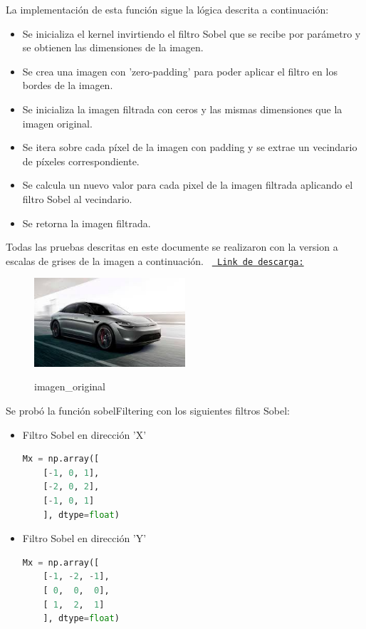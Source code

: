 \documentclass{article}
\begin{document}
    \clearpage
    \noindent
    La implementación de esta función sigue la lógica descrita a continuación:
    \begin{itemize}
        \item Se inicializa el kernel invirtiendo el filtro Sobel que se recibe por parámetro y se obtienen las dimensiones de la imagen.
        \item Se crea una imagen con 'zero-padding' para poder aplicar el filtro en los bordes de la imagen.
        \item Se inicializa la imagen filtrada con ceros y las mismas dimensiones que la imagen original.
        \item Se itera sobre cada píxel de la imagen con padding y se extrae un vecindario de píxeles correspondiente.
        \item Se calcula un nuevo valor para cada pixel de la imagen filtrada aplicando el filtro Sobel al vecindario.
        \item Se retorna la imagen filtrada.
    \end{itemize}
    
    \noindent
    Todas las pruebas descritas en este documente se realizaron con la version a escalas de grises de la imagen a continuación.
    \texttt{%
        \href{https://drive.google.com/uc?id=1Vjzotd2ggul9GuD0adkf5KHCen6vQupK&authuser=0}{%
            Link de descarga:}%
    }
    \begin{figure}[!ht]
        \centering
        \caption{imagen\_original}
        \includegraphics[width=0.5\textwidth]{img/carro}\label{fig:1}
    \end{figure}
    
    \noindent
    Se probó la función sobelFiltering con los siguientes filtros Sobel:
    \begin{itemize}
        \item Filtro Sobel en dirección 'X'
        \begin{lstlisting}[language=Python, caption={Filtro Sobel vertical},label={lst:sobelFiltersx}]
    Mx = np.array([
    [-1, 0, 1],
    [-2, 0, 2],
    [-1, 0, 1]
    ], dtype=float)
        \end{lstlisting}
        \item Filtro Sobel en dirección 'Y'
        \begin{lstlisting}[language=Python, caption={Filtros Sobel horizontal},label={lst:sobelFiltersy}]
    Mx = np.array([
    [-1, -2, -1],
    [ 0,  0,  0],
    [ 1,  2,  1]
    ], dtype=float)
        \end{lstlisting}
    \end{itemize}
    
\end{document}

